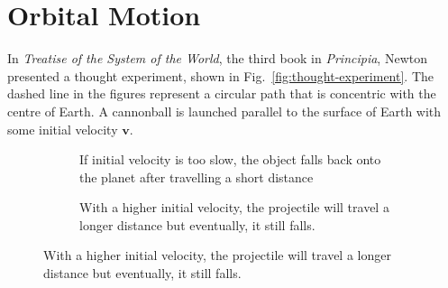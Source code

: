 \section{Orbital Motion}
\label{sec:orbital-motion}

In \emph{Treatise of the System of the World}, the third book in
\emph{Principia}, Newton presented a thought experiment, shown in
Fig.~\ref{fig:thought-experiment}. The dashed line in the figures represent a
circular path that is concentric with the centre of Earth. A cannonball is
launched parallel to the surface of Earth with some initial velocity
$\bm v$.
\begin{figure}[ht]
  \centering
  \begin{subfigure}{.4\textwidth}
    \centering
    \caption{If initial velocity is too slow, the object falls back onto the
      planet after travelling a short distance}
  \end{subfigure}
  \hspace{.3in}
  \begin{subfigure}{.4\textwidth}
    \centering
    \caption{With a higher initial velocity, the projectile will travel a longer
      distance but eventually, it still falls.}
  \end{subfigure}


\end{figure}

